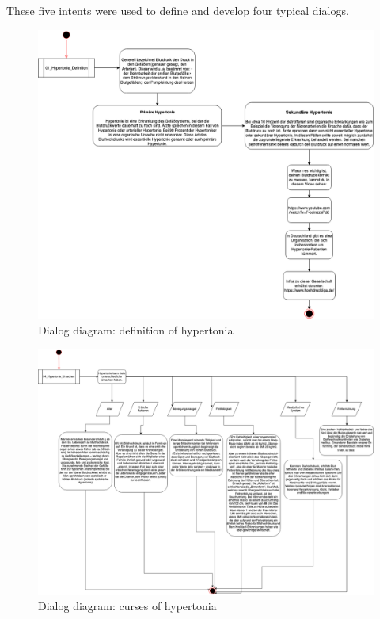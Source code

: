 These five intents were used to define and develop four typical dialogs.

\begin{figure}[h]
	\centering
	\includegraphics[width=1\textwidth]{images/01_Hypertonie_Definition.png}
	\caption{Dialog diagram: definition of hypertonia}
	\label{dialog_diagram_01}
\end{figure}

\begin{figure}[h]
	\centering
	\includegraphics[width=1\textwidth]{images/02_Hypertonie_Ursachen.png}
	\caption{Dialog diagram: curses of hypertonia}
	\label{dialog_diagram_02}
\end{figure}

